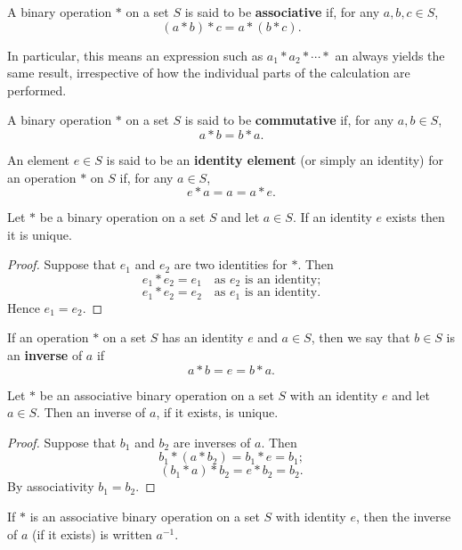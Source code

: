 A binary operation $\ast$ on a set $S$ is said to be \textbf{associative} if, for any $a, b, c \in S$,
\[ (a \ast b) \ast c = a \ast (b \ast c). \]

In particular, this means an expression such as $a_1 \ast a_2 \ast \cdots \ast$ an always yields the same result, irrespective of how the individual parts of the calculation are performed.

A binary operation $\ast$ on a set $S$ is said to be \textbf{commutative} if, for any $a, b \in S$,
\[ a \ast b = b \ast a. \]

An element $e \in S$ is said to be an \textbf{identity element} (or simply an identity) for an operation $\ast$ on $S$ if, for any $a \in S$,
\[ e \ast a = a = a \ast e. \]

\begin{proposition}
Let $\ast$ be a binary operation on a set $S$ and let $a \in S$. If an identity $e$ exists then it is unique.
\end{proposition}
\begin{proof}
Suppose that $e_1$ and $e_2$ are two identities for $\ast$. Then
\[ e_1 \ast e_2 = e_1 \quad \text{as }e_2\text{ is an identity;} \]
\[ e_1 \ast e_2 = e_2 \quad \text{as }e_1\text{ is an identity.} \]
Hence $e_1 = e_2$.
\end{proof}

If an operation $\ast$ on a set $S$ has an identity $e$ and $a \in S$, then we say that $b \in S$ is an \textbf{inverse} of $a$ if
\[ a \ast b = e = b \ast a. \]

\begin{proposition}
Let $\ast$ be an associative binary operation on a set $S$ with an identity $e$ and let $a \in S$. Then an inverse of $a$, if it exists, is unique.
\end{proposition}
\begin{proof}
Suppose that $b_1$ and $b_2$ are inverses of $a$. Then
\[ b_1 \ast (a \ast b_2) = b_1 \ast e = b_1; \]
\[ (b_1 \ast a) \ast b_2 = e \ast b_2 = b_2. \]
By associativity $b_1 = b_2$.
\end{proof}

\begin{notation}
If $\ast$ is an associative binary operation on a set $S$ with identity $e$, then the inverse of $a$ (if it exists) is written $a^{-1}$.
\end{notation}

